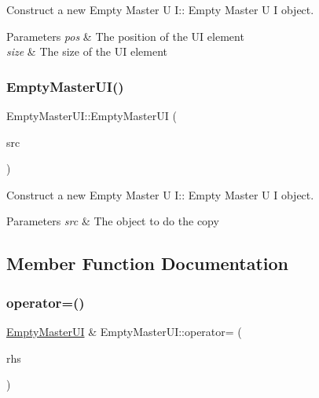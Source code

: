 Construct a new Empty Master U I\+:\+: Empty Master U I object. 


\begin{DoxyParams}{Parameters}
{\em pos} & The position of the UI element \\
\hline
{\em size} & The size of the UI element \\
\hline
\end{DoxyParams}
\mbox{\label{class_empty_master_u_i_aeac8276dd686dff08fd2e75828a421e5}} 
\subsubsection{\texorpdfstring{Empty\+Master\+U\+I()}{EmptyMasterUI()}\hspace{0.1cm}{\footnotesize\ttfamily [2/2]}}
{\footnotesize\ttfamily Empty\+Master\+U\+I\+::\+Empty\+Master\+UI (\begin{DoxyParamCaption}\item[{\hyperlink{class_empty_master_u_i}{Empty\+Master\+UI} const \&}]{src }\end{DoxyParamCaption})}



Construct a new Empty Master U I\+:\+: Empty Master U I object. 


\begin{DoxyParams}{Parameters}
{\em src} & The object to do the copy \\
\hline
\end{DoxyParams}


\subsection{Member Function Documentation}
\mbox{\label{class_empty_master_u_i_ad3666784fd24f54ec7e4c0e8002fc423}} 
\subsubsection{\texorpdfstring{operator=()}{operator=()}}
{\footnotesize\ttfamily \hyperlink{class_empty_master_u_i}{Empty\+Master\+UI} \& Empty\+Master\+U\+I\+::operator= (\begin{DoxyParamCaption}\item[{\hyperlink{class_empty_master_u_i}{Empty\+Master\+UI} const \&}]{rhs }\end{DoxyParamCaption})}



